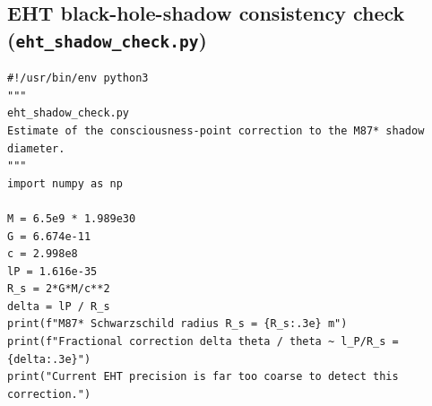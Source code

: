 \documentclass[11pt,a4paper]{article}
\theoremstyle{plain}
\begin{document}
\subsection{EHT black-hole-shadow consistency check (\texttt{eht\_shadow\_check.py})}

\begin{lstlisting}[title={eht\_shadow\_check.py}]
#!/usr/bin/env python3
"""
eht_shadow_check.py
Estimate of the consciousness-point correction to the M87* shadow diameter.
"""
import numpy as np

M = 6.5e9 * 1.989e30
G = 6.674e-11
c = 2.998e8
lP = 1.616e-35
R_s = 2*G*M/c**2
delta = lP / R_s
print(f"M87* Schwarzschild radius R_s = {R_s:.3e} m")
print(f"Fractional correction delta theta / theta ~ l_P/R_s = {delta:.3e}")
print("Current EHT precision is far too coarse to detect this correction.")
\end{lstlisting}
\end{document}
